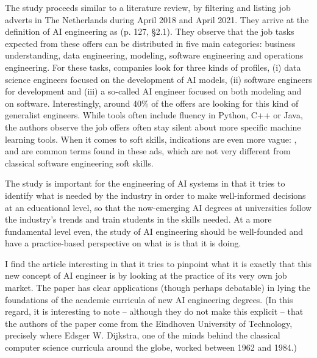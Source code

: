 The study proceeds similar to a literature review, by filtering and listing job adverts in The Netherlands during April 2018 and April 2021. They arrive at the definition of AI engineering as  (p. 127, \S 2.1). They observe that the job tasks expected from these offers can be distributed in five main categories: business understanding, data engineering, modeling, software engineering and operations engineering. For these tasks, companies look for three kinds of profiles, (i) data science engineers focused on the development of AI models, (ii) software engineers for development and (iii) a so-called  AI engineer focused on both modeling and on software. Interestingly, around 40\% of the offers are looking for this kind of generalist engineers. While tools often include fluency in Python, C++ or Java, the authors observe the job offers often stay silent about more specific machine learning tools. When it comes to soft skills, indications are even more vague: ,  and  are common terms found in these ads, which are not very different from classical software engineering soft skills.

The study is important for the engineering of AI systems in that it tries to identify what is needed by the industry in order to make well-informed decisions at an educational level, so that the now-emerging AI degrees at universities follow the industry's trends and train students in the skills needed. At a more fundamental level even, the study of AI engineering should be well-founded and have a practice-based perspective on what is is that it is doing.

I find the article interesting in that it tries to pinpoint what it is exactly that this new concept of AI engineer is by looking at the practice of its very own job market. The paper has clear applications (though perhaps debatable) in lying the foundations of the academic curricula of new AI engineering degrees. (In this regard, it is interesting to note -- although they do not make this explicit -- that the authors of the paper come from the Eindhoven University of Technology, precisely where Edsger W. Dijkstra, one of the minds behind the classical computer science curricula around the globe, worked between 1962 and 1984.) 


